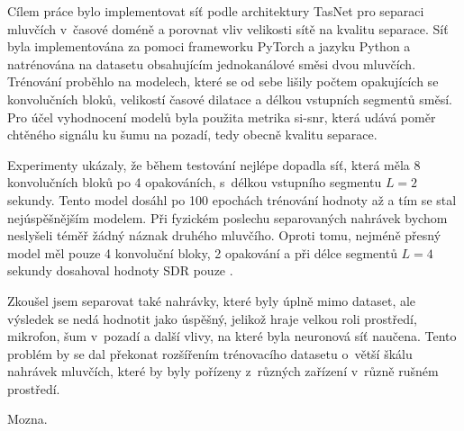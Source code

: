 Cílem práce bylo implementovat síť podle architektury TasNet pro separaci mluvčích v~časové doméně a porovnat vliv velikosti sítě na kvalitu separace. Síť byla implementována za pomoci frameworku PyTorch a jazyku Python a natrénována na datasetu obsahujícím jednokanálové směsi dvou mluvčích. Trénování proběhlo na  modelech, které se od sebe lišily počtem opakujících se konvolučních bloků, velikostí časové dilatace a délkou vstupních segmentů směsí. Pro účel vyhodnocení modelů byla použita metrika si-snr, která udává poměr chtěného signálu ku šumu na pozadí, tedy obecně kvalitu separace. 

Experimenty ukázaly, že během testování nejlépe dopadla síť, která měla 8 konvolučních bloků po 4 opakováních, s~délkou vstupního segmentu $L=2$ sekundy. Tento model dosáhl po 100 epochách trénování hodnoty až  a tím se stal nejúspěšnějším modelem. Při fyzickém poslechu separovaných nahrávek bychom neslyšeli téměř žádný náznak druhého mluvčího. Oproti tomu, nejméně přesný model měl pouze 4 konvoluční bloky, 2 opakování a při délce segmentů $L=4$ sekundy dosahoval hodnoty SDR pouze .

Zkoušel jsem separovat také nahrávky, které byly úplně mimo dataset, ale výsledek se nedá hodnotit jako úspěšný, jelikož hraje velkou roli prostředí, mikrofon, šum v~pozadí a další vlivy, na které byla neuronová síť naučena. Tento problém by se dal překonat rozšířením trénovacího datasetu o~větší škálu nahrávek mluvčích, které by byly pořízeny z~různých zařízení v~různě rušném prostředí.

Mozna.


